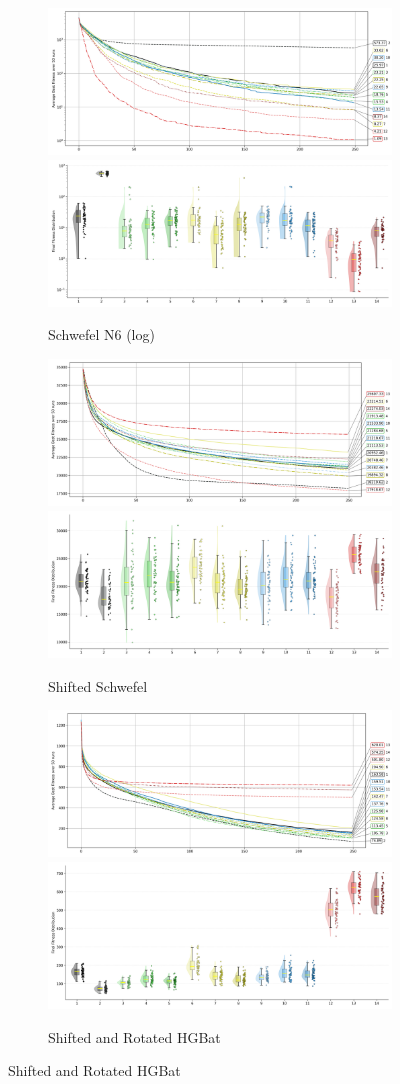 \begin{figure}[p]
\begin{subfigure}{1\textwidth}
    \centering
    \includegraphics[width=.49\textwidth]{Figures/results/100/Schwefel_N6_All_selected_algorithms_dim100_annot_legend.png}
    \includegraphics[width=.49\textwidth]{Figures/results/100/Schwefel_N6_all_dim100_raincloud_vertical.png}
    \caption{Schwefel N6 (log)}
\end{subfigure}

\begin{subfigure}{1\textwidth}
    \centering
    \includegraphics[width=.49\textwidth]{Figures/results/100/Shifted_Schwefel_All_selected_algorithms_dim100_annot_legend.png}
    \includegraphics[width=.49\textwidth]{Figures/results/100/Shifted_Schwefel_all_dim100_raincloud_vertical.png}
    \caption{Shifted Schwefel}
\end{subfigure}

\begin{subfigure}{1\textwidth}
    \centering
    \includegraphics[width=.49\textwidth]{Figures/results/100/Shifted_and_Rotated_HGBat_All_selected_algorithms_dim100_annot_legend.png}
    \includegraphics[width=.49\textwidth]{Figures/results/100/Shifted_and_Rotated_HGBat_all_dim100_raincloud_vertical.png}
    \caption{Shifted and Rotated HGBat}
\end{subfigure}


\end{figure}
